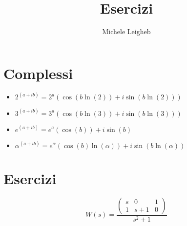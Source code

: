 \documentclass{article}
\title{Esercizi}
\author{Michele Leigheb}
\date{}
\begin{document}
\maketitle
\tableofcontents{}
\section{Complessi}
\begin{itemize}
	\item \(\displaystyle 2^{(a+ib)} = 2^a (\cos(b \ln(2)) + i\sin(b \ln(2))) \)
	\item \(\displaystyle 3^{(a+ib)} = 3^a (\cos(b \ln(3)) + i\sin(b \ln(3))) \)
	\item \(\displaystyle e^{(a+ib)} = e^a (\cos(b)) + i\sin(b) \)
	\item \(\displaystyle \alpha^{(a+ib)} = e^{\alpha} (\cos(b)\ln(\alpha)) + i\sin(b\ln(\alpha)) \)
\end{itemize}



\section{Esercizi}

\[ W(s) = \frac{\left(\begin{matrix}s & 0 & 1\\1 & s + 1 & 0\end{matrix}\right)}{s^{2} + 1} \]
\end{document}
